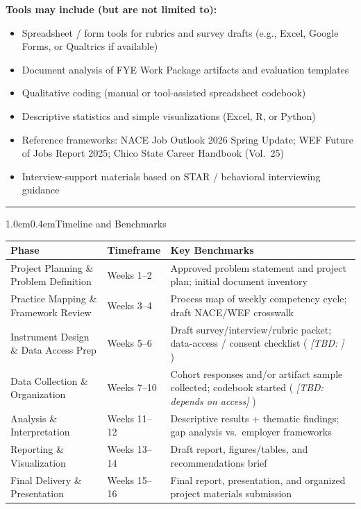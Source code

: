 \documentclass[11pt,letterpaper]{article}
\makeatletter
\newcommand{\sectionrule}{\par\vspace{0.4em}\noindent\rule{\textwidth}{0.6pt}\vspace{0.55em}}
\newcommand{\fieldlabel}[1]{\textbf{#1}}
\newcommand{\tbdtxt}[1]{%
  \textit{[TBD\if\relax\detokenize{#1}\relax\else: #1\fi]}%
}
\renewcommand\section{\@startsection{section}{1}{\z@}%
  {1.0em}{0.4em}{\large\bfseries}}
\makeatother
\begin{document}
\vspace{0.3em}
\fieldlabel{Tools may include (but are not limited to):}
\begin{itemize}
  \item Spreadsheet / form tools for rubrics and survey drafts (e.g., Excel, Google Forms, or Qualtrics if available)
  \item Document analysis of FYE Work Package artifacts and evaluation templates
  \item Qualitative coding (manual or tool-assisted spreadsheet codebook)
  \item Descriptive statistics and simple visualizations (Excel, R, or Python)
  \item Reference frameworks: NACE Job Outlook 2026 Spring Update; WEF Future of Jobs Report 2025; Chico State Career Handbook (Vol.~25)
  \item Interview-support materials based on STAR / behavioral interviewing guidance
\end{itemize}

\sectionrule

\section{Timeline and Benchmarks}

\noindent
\renewcommand{\arraystretch}{1.25}
\begin{tabularx}{\textwidth}{| >{\raggedright\arraybackslash}p{} | >{\centering\arraybackslash}p{} | >{\raggedright\arraybackslash}X |}
\hline
\textbf{Phase} & \textbf{Timeframe} & \textbf{Key Benchmarks} \\
\hline
Project Planning \& Problem Definition
& Weeks 1--2
& Approved problem statement and project plan; initial document inventory \\
\hline
Practice Mapping \& Framework Review
& Weeks 3--4
& Process map of weekly competency cycle; draft NACE/WEF crosswalk \\
\hline
Instrument Design \& Data Access Prep
& Weeks 5--6
& Draft survey/interview/rubric packet; data-access / consent checklist (\tbdtxt{}) \\
\hline
Data Collection \& Organization
& Weeks 7--10
& Cohort responses and/or artifact sample collected; codebook started (\tbdtxt{depends on access}) \\
\hline
Analysis \& Interpretation
& Weeks 11--12
& Descriptive results + thematic findings; gap analysis vs.\ employer frameworks \\
\hline
Reporting \& Visualization
& Weeks 13--14
& Draft report, figures/tables, and recommendations brief \\
\hline
Final Delivery \& Presentation
& Weeks 15--16
& Final report, presentation, and organized project materials submission \\
\hline
\end{tabularx}
\renewcommand{\arraystretch}{1.0}
\end{document}
